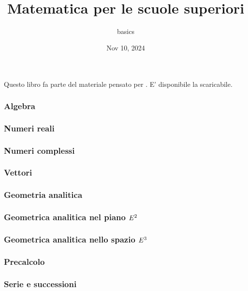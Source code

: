 \documentclass[letterpaper,10pt,english]{jupyterBook}
\title{Matematica per le scuole superiori}
\date{Nov 10, 2024}
\author{basics}
\begin{document}
\pagestyle{empty}
\sphinxmaketitle
\pagestyle{plain}
\sphinxtableofcontents
\pagestyle{normal}
\label{\detokenize{intro::doc}}


\sphinxAtStartPar
Questo libro fa parte del materiale pensato per . E’ disponibile la  scaricabile.

\sphinxAtStartPar
{} 

\sphinxAtStartPar
{}
\subsubsection*{Algebra}


\subsubsection*{Numeri reali}
\subsubsection*{Numeri complessi}
\subsubsection*{Vettori}
\subsubsection*{Geometria analitica}


\subsubsection*{Geometrica analitica nel piano \protect\(E^2\protect\)}
\subsubsection*{Geometrica analitica nello spazio \protect\(E^3\protect\)}
\subsubsection*{Pre\sphinxhyphen{}calcolo}


\subsubsection*{Serie e successioni}
\end{document}
